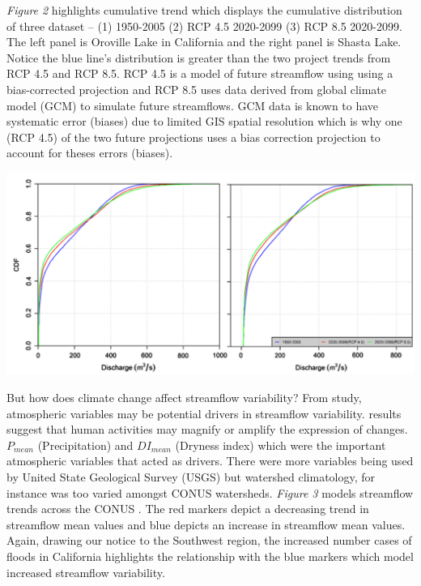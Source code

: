 \documentclass[a4paper,man,biblatex]{apa7}
\begin{document}
\vspace{2ex}
\par \textit{Figure 2} highlights cumulative trend which displays the cumulative distribution of three dataset -- (1) 1950-2005 (2) RCP 4.5 2020-2099 (3) RCP 8.5 2020-2099. The left panel is Oroville Lake in California and the right panel is Shasta Lake. Notice the blue line's distribution is greater than the two project trends from RCP 4.5 and RCP 8.5. RCP 4.5 is a model of future streamflow using using a bias-corrected projection and RCP 8.5 uses data derived from global climate model (GCM) to simulate future streamflows. GCM data is known to have systematic error (biases) due to limited GIS spatial resolution which is why one (RCP 4.5) of the two future projections uses a bias correction projection to account for theses errors (biases).\\
\begin{minipage}{0.65\linewidth}   
    \centering
    \includegraphics[scale=0.40]{cdf_streamflow.png}
\end{minipage}
\vspace{2ex}
\par But how does climate change affect streamflow variability? From \textcite{rice_2016} study, atmospheric variables may be potential drivers in streamflow variability. \textcite{rice_2016} results suggest that human activities may magnify or amplify the expression of changes. $P_\textit{mean}$ (Precipitation) and $DI_\textit{mean}$ (Dryness index) which were the important atmospheric variables that acted as drivers. There were more variables being used by United State Geological Survey (USGS) but watershed climatology, for instance was too varied amongst CONUS watersheds. \textit{Figure 3} models streamflow trends across the CONUS \autocite{rice_2016}. The red markers depict a decreasing trend in streamflow mean values and blue depicts an increase in streamflow mean values. Again, drawing our notice to the Southwest region, the increased number cases of floods in California highlights the relationship with the blue markers which model increased streamflow variability. \\
\end{document}
